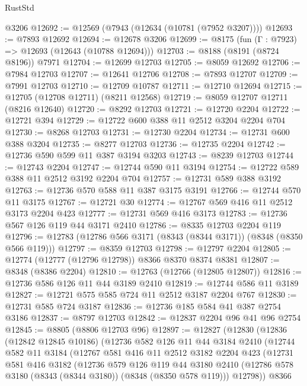 \begin{lexlean}{RustStd}
\begin{coremodule}
    @3206
@12692 := @12569 (@7943 (@12634 (@10781 (@7952 @3207))))
@12693 := @7893 @12692
@12694 := @12678 @3206
@12699 := @8175 (fun (Γ : @7923) => @12693 (@12643 (@10788 @12694)))
@12703 := @8188 (@8191 (@8724 @8196)) @7971
@12704 := @12699 @12703
@12705 := @8059 @12692
@12706 := @7984 @12703
@12707 := @12641 @12706
@12708 := @7893 @12707
@12709 := @7991 @12703
@12710 := @12709 @10787
@12711 := @12710 @12694
@12715 := @12705 (@12708 @12711) (@8211 @12568)
@12719 := @8059 @12707 @12711 (@8216 @12640)
@12720 := @8292 @12703
@12721 := @12720 @2204
@12722 := @12721 @394
@12729 := @12722 @600 @388 @11 @2512 @3204 @2204 @704
@12730 := @8268 @12703
@12731 := @12730 @2204
@12734 := @12731 @600 @388 @3204
@12735 := @8277 @12703
@12736 := @12735 @2204
@12742 := @12736 @590 @599 @11 @387 @3194 @3203
@12743 := @8239 @12703
@12744 := @12743 @2204
@12747 := @12744 @590 @11 @3194
@12754 := @12722 @589 @388 @11 @2512 @3192 @2204 @704
@12757 := @12731 @589 @388 @3192
@12763 := @12736 @570 @588 @11 @387 @3175 @3191
@12766 := @12744 @570 @11 @3175
@12767 := @12721 @30
@12774 := @12767 @569 @416 @11 @2512 @3173 @2204 @423
@12777 := @12731 @569 @416 @3173
@12783 := @12736 @567 @126 @119 @44 @3171 @2410
@12786 := @8335 @12703 @2204 @119
@12796 := @12783 (@12786 @566 @3171 (@8343 (@8344 @3171)) (@8348 (@8350 @566 @119)))
@12797 := @8359 @12703
@12798 := @12797 @2204
@12805 := @12774 (@12777 (@12796 @12798)) @8366 @8370 @8374 @8381
@12807 := @8348 (@8386 @2204)
@12810 := @12763 (@12766 (@12805 @12807))
@12816 := @12736 @586 @126 @11 @44 @3189 @2410
@12819 := @12744 @586 @11 @3189
@12827 := @12721 @575 @585 @724 @11 @2512 @3187 @2204 @767
@12830 := @12731 @585 @724 @3187
@12836 := @12736 @185 @584 @41 @387 @2754 @3186
@12837 := @8797 @12703
@12842 := @12837 @2204 @96 @41 @96 @2754
@12845 := @8805 (@8806 @12703 @96)
@12897 := @12827
    (@12830
      (@12836
        (@12842 @12845 @10186)
        (@12736
          @582
          @126
          @11
          @44
          @3184
          @2410
          (@12744
            @582
            @11
            @3184
            (@12767
              @581
              @416
              @11
              @2512
              @3182
              @2204
              @423
              (@12731
                @581
                @416
                @3182
                (@12736
                  @579
                  @126
                  @119
                  @44
                  @3180
                  @2410
                  (@12786 @578 @3180 (@8343 (@8344 @3180)) (@8348 (@8350 @578 @119)))
                  @12798))
              @8366

\end{coremodule}
\end{lexlean}
